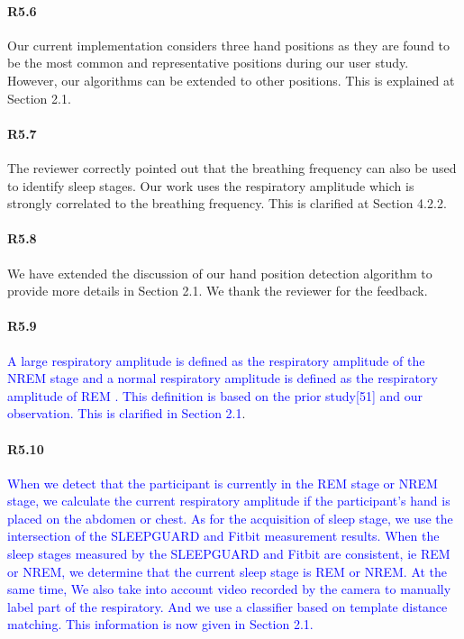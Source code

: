 \paragraph{R5.6} Our current implementation considers three hand positions as they are found to be the most common and representative
positions during our user study. However, our algorithms can be extended to other positions. This is explained at Section 2.1.

\paragraph{R5.7} The reviewer correctly pointed out that the breathing frequency can also be used to identify sleep stages. Our work uses
the respiratory amplitude which is strongly correlated to the breathing frequency. This is clarified at Section 4.2.2.

\paragraph{R5.8} We have extended the discussion of our hand position detection algorithm to provide more details in Section 2.1. We
thank the reviewer for the feedback.

\paragraph{R5.9} \textcolor{blue}{ A large respiratory amplitude is defined as the respiratory amplitude of the NREM stage and a normal respiratory amplitude is defined as the respiratory amplitude of REM . This definition is based on the prior study[51] and our observation. This is clarified in Section 2.1}.


\paragraph{R5.10} \textcolor{blue}{ When we detect that the participant is currently in the REM stage or NREM stage, we calculate the current respiratory amplitude if the participant's hand is placed on the abdomen or chest. As for the acquisition of sleep stage, we use the intersection of the SLEEPGUARD and Fitbit measurement results. When the sleep stages measured by the SLEEPGUARD and Fitbit are consistent, ie REM or NREM, we determine that the current sleep stage is REM or NREM.  At the same time, We also take into account video recorded by the camera to manually label part of the respiratory. And we use a classifier based on template distance matching. This information is now given in Section 2.1.}

